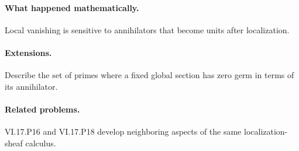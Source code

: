 \paragraph{What happened mathematically.}
Local vanishing is sensitive to annihilators that become units after localization.

\paragraph{Extensions.}
Describe the set of primes where a fixed global section has zero germ in terms of its annihilator.

\paragraph{Related problems.}
VI.17.P16 and VI.17.P18 develop neighboring aspects of the same localization-sheaf calculus.
\fi
